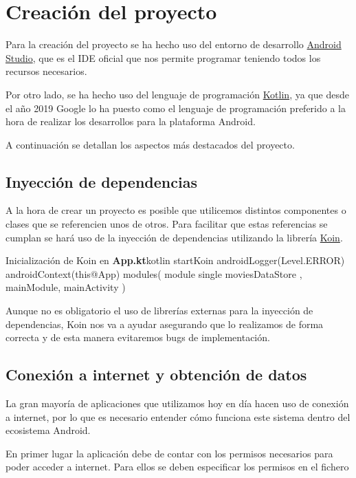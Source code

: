 \documentclass{\ClassPath/viu-tfm-template}
\begin{document}
\chapter{Creación del proyecto}

Para la creación del proyecto se ha hecho uso del entorno de desarrollo \href{https://developer.android.com/studio/}{Android Studio}, que es el IDE oficial que nos permite programar teniendo todos los recursos necesarios.

Por otro lado, se ha hecho uso del lenguaje de programación \href{https://kotlinlang.org/}{Kotlin}, ya que desde el año 2019 Google lo ha puesto como el lenguaje de programación preferido a la hora de realizar los desarrollos para la plataforma Android.

A continuación se detallan los aspectos más destacados del proyecto.

\section{Inyección de dependencias}
A la hora de crear un proyecto es posible que utilicemos distintos componentes o clases que se referencien unos de otros. Para facilitar que estas referencias se cumplan se hará uso de la inyección de dependencias utilizando la librería \href{https://insert-koin.io/}{Koin}.


\begin{mycode}{Inicialización de Koin en \textbf{App.kt}}{kotlin}{}
startKoin {
    androidLogger(Level.ERROR)
    androidContext(this@App)
    modules(
        module { single { moviesDataStore } },
        mainModule,
        mainActivity
    )
}
\end{mycode}

Aunque no es obligatorio el uso de librerías externas para la inyección de dependencias, Koin nos va a ayudar asegurando que lo realizamos de forma correcta y de esta manera evitaremos bugs de implementación.

\section{Conexión a internet y obtención de datos}
La gran mayoría de aplicaciones que utilizamos hoy en día hacen uso de conexión a internet, por lo que es necesario entender cómo funciona este sistema dentro del ecosistema Android.

En primer lugar la aplicación debe de contar con los permisos necesarios para poder acceder a internet. Para ellos se deben especificar los permisos en el fichero 
\end{document}
